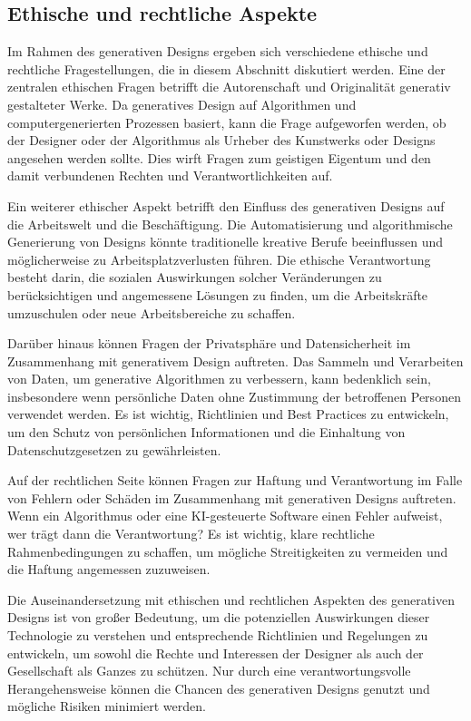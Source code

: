 \subsection*{Ethische und rechtliche Aspekte}
Im Rahmen des generativen Designs ergeben sich verschiedene ethische und rechtliche Fragestellungen, die in diesem Abschnitt diskutiert werden. Eine der zentralen ethischen Fragen betrifft die Autorenschaft und Originalität generativ gestalteter Werke. Da generatives Design auf Algorithmen und computergenerierten Prozessen basiert, kann die Frage aufgeworfen werden, ob der Designer oder der Algorithmus als Urheber des Kunstwerks oder Designs angesehen werden sollte. Dies wirft Fragen zum geistigen Eigentum und den damit verbundenen Rechten und Verantwortlichkeiten auf.

Ein weiterer ethischer Aspekt betrifft den Einfluss des generativen Designs auf die Arbeitswelt und die Beschäftigung. Die Automatisierung und algorithmische Generierung von Designs könnte traditionelle kreative Berufe beeinflussen und möglicherweise zu Arbeitsplatzverlusten führen. Die ethische Verantwortung besteht darin, die sozialen Auswirkungen solcher Veränderungen zu berücksichtigen und angemessene Lösungen zu finden, um die Arbeitskräfte umzuschulen oder neue Arbeitsbereiche zu schaffen.

Darüber hinaus können Fragen der Privatsphäre und Datensicherheit im Zusammenhang mit generativem Design auftreten. Das Sammeln und Verarbeiten von Daten, um generative Algorithmen zu verbessern, kann bedenklich sein, insbesondere wenn persönliche Daten ohne Zustimmung der betroffenen Personen verwendet werden. Es ist wichtig, Richtlinien und Best Practices zu entwickeln, um den Schutz von persönlichen Informationen und die Einhaltung von Datenschutzgesetzen zu gewährleisten.

Auf der rechtlichen Seite können Fragen zur Haftung und Verantwortung im Falle von Fehlern oder Schäden im Zusammenhang mit generativen Designs auftreten. Wenn ein Algorithmus oder eine KI-gesteuerte Software einen Fehler aufweist, wer trägt dann die Verantwortung? Es ist wichtig, klare rechtliche Rahmenbedingungen zu schaffen, um mögliche Streitigkeiten zu vermeiden und die Haftung angemessen zuzuweisen.

Die Auseinandersetzung mit ethischen und rechtlichen Aspekten des generativen Designs ist von großer Bedeutung, um die potenziellen Auswirkungen dieser Technologie zu verstehen und entsprechende Richtlinien und Regelungen zu entwickeln, um sowohl die Rechte und Interessen der Designer als auch der Gesellschaft als Ganzes zu schützen. Nur durch eine verantwortungsvolle Herangehensweise können die Chancen des generativen Designs genutzt und mögliche Risiken minimiert werden.


